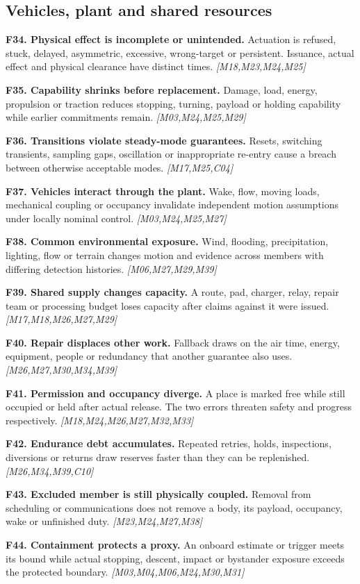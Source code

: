 \documentclass[11pt]{article}
\newcommand{\f}[4]{\par\smallskip\noindent\textbf{#1. #2.} #3 \textit{[#4]}\par}
\begin{document}
\subsection{Vehicles, plant and shared resources}
\f{F34}{Physical effect is incomplete or unintended}{Actuation is refused, stuck, delayed, asymmetric, excessive, wrong-target or persistent. Issuance, actual effect and physical clearance have distinct times.}{M18,M23,M24,M25}
\f{F35}{Capability shrinks before replacement}{Damage, load, energy, propulsion or traction reduces stopping, turning, payload or holding capability while earlier commitments remain.}{M03,M24,M25,M29}
\f{F36}{Transitions violate steady-mode guarantees}{Resets, switching transients, sampling gaps, oscillation or inappropriate re-entry cause a breach between otherwise acceptable modes.}{M17,M25,C04}
\f{F37}{Vehicles interact through the plant}{Wake, flow, moving loads, mechanical coupling or occupancy invalidate independent motion assumptions under locally nominal control.}{M03,M24,M25,M27}
\f{F38}{Common environmental exposure}{Wind, flooding, precipitation, lighting, flow or terrain changes motion and evidence across members with differing detection histories.}{M06,M27,M29,M39}
\f{F39}{Shared supply changes capacity}{A route, pad, charger, relay, repair team or processing budget loses capacity after claims against it were issued.}{M17,M18,M26,M27,M29}
\f{F40}{Repair displaces other work}{Fallback draws on the air time, energy, equipment, people or redundancy that another guarantee also uses.}{M26,M27,M30,M34,M39}
\f{F41}{Permission and occupancy diverge}{A place is marked free while still occupied or held after actual release. The two errors threaten safety and progress respectively.}{M18,M24,M26,M27,M32,M33}
\f{F42}{Endurance debt accumulates}{Repeated retries, holds, inspections, diversions or returns draw reserves faster than they can be replenished.}{M26,M34,M39,C10}
\f{F43}{Excluded member is still physically coupled}{Removal from scheduling or communications does not remove a body, its payload, occupancy, wake or unfinished duty.}{M23,M24,M27,M38}
\f{F44}{Containment protects a proxy}{An onboard estimate or trigger meets its bound while actual stopping, descent, impact or bystander exposure exceeds the protected boundary.}{M03,M04,M06,M24,M30,M31}
\end{document}
